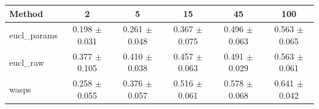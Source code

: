 \begin{table}[htbp]
\centering
\begin{NiceTabular}{lccccc}
\toprule
Method & 2 & 5 & 15 & 45 & 100 \\
\midrule
eucl\_params & 0.198 $\pm$ 0.031 & 0.261 $\pm$ 0.048 & 0.367 $\pm$ 0.075 & 0.496 $\pm$ 0.063 & 0.563 $\pm$ 0.065 \\
eucl\_raw & 0.377 $\pm$ 0.105 & 0.410 $\pm$ 0.038 & 0.457 $\pm$ 0.063 & 0.491 $\pm$ 0.029 & 0.563 $\pm$ 0.061 \\
wasps & 0.258 $\pm$ 0.055 & 0.376 $\pm$ 0.057 & 0.516 $\pm$ 0.061 & 0.578 $\pm$ 0.068 & 0.641 $\pm$ 0.042 \\
\bottomrule
\end{NiceTabular}
\label{tab:sens_river_n_train_knn}
\end{table}
